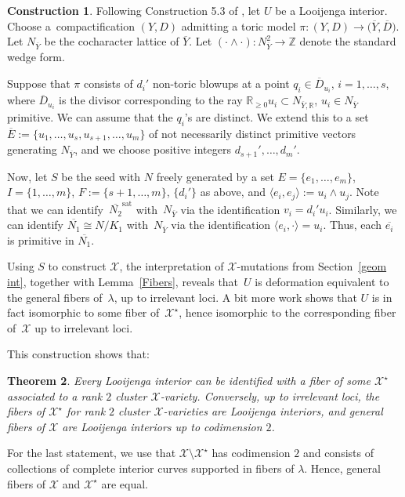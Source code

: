 \documentclass[11pt]{article}
\numberwithin{equation}{section}
\numberwithin{figure}{section}
\numberwithin{table}{section}
\DeclareMathOperator{\sat}{sat}
\let\?=\overline
\let\bb=\mathbb
\let\rar=\rightarrow
\let\s=\mathcal
\newtheorem{thm}{Theorem}[section]
\theoremstyle{definition}
\newtheorem{constr}[thm]{Construction}
\begin{document}
\begin{constr}\label{LooijengaConstr}Following Construction 5.3 of \cite{GHK3}, let $U$ be a Looijenga interior. Choose a~compactification $(Y,D)$ admitting a toric model $\pi\colon (Y,D)\rar \big(\?{Y},\?{D}\big)$. Let $N_{\?{Y}}$ be the cocha\-rac\-ter lattice of $\?{Y}$. Let $(\cdot \wedge \cdot)\colon N_{\?{Y}}^2\rar \bb{Z}$ denote the standard wedge form.

Suppose that $\pi$ consists of $d_i'$ non-toric blowups at a point $q_i\in \?{D}_{u_i}$, $i=1,\dots,s$, where $\?{D}_{u_i}$ is the divisor corresponding to the ray $\bb{R}_{\geq 0} u_i \subset N_{\?{Y},\bb{R}}$, $u_i\in N_{\?{Y}}$ primitive.
 We can assume that the $q_i$'s are distinct. We extend this to a set $\?{E}:=\{u_1,\dots,u_s,u_{s+1},\dots,u_m\}$ of not necessarily distinct primitive vectors generating $N_{\?{Y}}$, and we choose positive integers $d_{s+1}',\dots,d_m'$.

Now, let $S$ be the seed with $N$ freely generated by a set $E=\{e_1,\dots,e_m\}$, $I=\{1,\dots,m\}$, $F:=\{s+1,\dots,m\}$, $\{d_i'\}$ as above, and $\langle e_i,e_j \rangle := u_i \wedge u_j$.
 Note that we can identify~$\?{N_2}^{\sat}$ with~$N_{\?{Y}}$ via the identification $v_i=d_i'u_i$. Similarly, we can identify $\?{N_1}\cong N/K_1$ with~$N_{\?{Y}}$ via the identification $\langle e_i,\cdot\rangle = u_i$. Thus, each $\?{e_i}$ is primitive in $\?{N_1}$.

 Using $S$ to construct $\s{X}$, the interpretation of $\s{X}$-mutations from Section~\ref{geom int}, together with Lemma~\ref{Fibers}, reveals that~$U$ is deformation equivalent to the general fibers of~$\lambda$, up to irrelevant loci. A bit more work shows that $U$ is in fact isomorphic to some fiber of~$\s{X}^{\star}$, hence isomorphic to the corresponding fiber of~$\s{X}$ up to irrelevant loci.
\end{constr}

This construction shows that:

\begin{thm}\label{Looijenga}Every Looijenga interior can be identified with a fiber of some $\s{X}^{\star}$ associated to a rank $2$ cluster $\s{X}$-variety. Conversely, up to irrelevant loci, the fibers of $\s{X}^{\star}$ for rank $2$ cluster $\s{X}$-varieties are Looijenga interiors, and general fibers of $\s{X}$ are Looijenga interiors up to codimension $2$.
 \end{thm}
For the last statement, we use that $\s{X}\setminus \s{X}^{\star}$ has codimension $2$ and consists of collections of complete interior curves supported in fibers of $\lambda$. Hence, general fibers of $\s{X}$ and $\s{X}^{\star}$ are equal.
\end{document}
